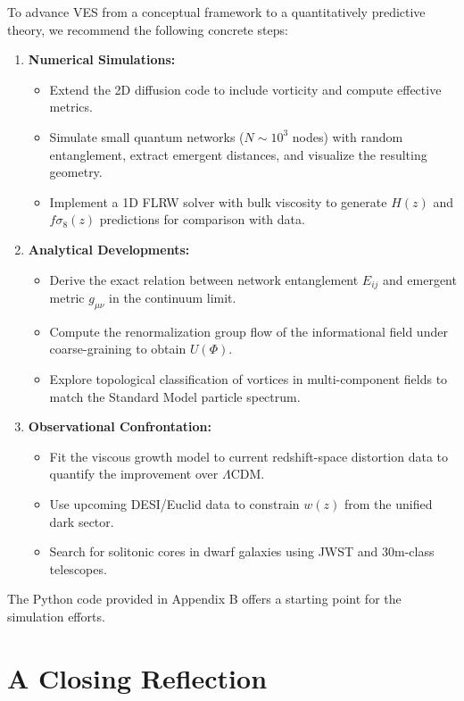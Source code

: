 \documentclass[12pt,a4paper]{book}
\begin{document}
To advance VES from a conceptual framework to a quantitatively predictive theory, we recommend the following concrete steps:
\begin{enumerate}
    \item \textbf{Numerical Simulations:}
    \begin{itemize}
        \item Extend the 2D diffusion code to include vorticity and compute effective metrics.
        \item Simulate small quantum networks ($N \sim 10^3$ nodes) with random entanglement, extract emergent distances, and visualize the resulting geometry.
        \item Implement a 1D FLRW solver with bulk viscosity to generate $H(z)$ and $f\sigma_8(z)$ predictions for comparison with data.
    \end{itemize}
    \item \textbf{Analytical Developments:}
    \begin{itemize}
        \item Derive the exact relation between network entanglement $E_{ij}$ and emergent metric $g_{\mu\nu}$ in the continuum limit.
        \item Compute the renormalization group flow of the informational field under coarse-graining to obtain $U(\Phi)$.
        \item Explore topological classification of vortices in multi-component fields to match the Standard Model particle spectrum.
    \end{itemize}
    \item \textbf{Observational Confrontation:}
    \begin{itemize}
        \item Fit the viscous growth model to current redshift-space distortion data to quantify the improvement over $\Lambda$CDM.
        \item Use upcoming DESI/Euclid data to constrain $w(z)$ from the unified dark sector.
        \item Search for solitonic cores in dwarf galaxies using JWST and 30m-class telescopes.
    \end{itemize}
\end{enumerate}
The Python code provided in Appendix B offers a starting point for the simulation efforts.

\section{A Closing Reflection}
\end{document}
